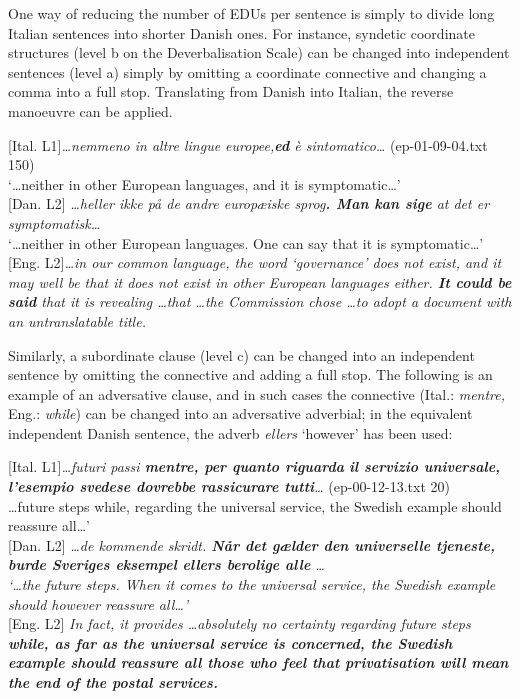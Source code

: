 \documentclass[output=paper]{LSP/langsci}
\begin{document}
One way of reducing the number of EDUs per sentence is simply to divide long Italian sentences into shorter Danish ones. For instance, syndetic coordinate structures (level b on the Deverbalisation Scale) can be changed into independent sentences (level a) simply by omitting a coordinate connective and changing a comma into a full stop. Translating from Danish into Italian, the reverse manoeuvre can be applied. 

\ea\label{ex:korzen:14}
\textup{[Ital. L1]}\textit{\ldots nemmeno in altre lingue europee\textup{,}\textbf{ed} è sintomatico\ldots } \textup{(ep-01-09-04.txt 150)}\\

  `\ldots neither in other European languages, and it is symptomatic\ldots '\\
\textup{[Dan. L2] }\textit{\ldots heller ikke på de andre europæiske sprog\textbf{. Man kan sige} at det er symptomatisk\ldots}\\ 

 `\ldots neither in other European languages. One can say that it is symptomatic\ldots '\\

\textup {[Eng. L2]}\textit{\ldots in our common language, the word  `governance' does not exist, and it may well be that it does not exist in other European languages either. \textbf{It could be said} that it is revealing \ldots  that \ldots  the Commission chose \ldots  to adopt a document with an untranslatable title.}
\z

Similarly, a subordinate clause (level c) can be changed into an independent sentence by omitting the connective and adding a full stop. The following is an example of an adversative clause, and in such cases the connective (Ital.: \textit{mentre, }Eng.: \textit{while}) can be changed into an adversative adverbial; in the equivalent independent Danish sentence, the adverb \textit{ellers }`however' has been used: 

\ea\label{ex:korzen:15}
\textup{[Ital. L1]}\textit{\ldots futuri passi \textbf{mentre, per quanto riguarda} \textbf{il servizio universale, l'esempio svedese dovrebbe rassicurare tutti}\ldots} \textup{(ep-00-12-13.txt 20)}\\
  \ldots future steps while, regarding the universal service, the Swedish example should reassure all\ldots ' \\
  \textup{[Dan. L2] }\textit{\ldots de kommende skridt. \textbf{Når det gælder den universelle tjeneste, burde Sveriges eksempel ellers berolige alle }\ldots }\\
  \textit{`\ldots the future steps. When it comes to the universal service, the Swedish example should however reassure all\ldots ' }\\
\textup{[Eng. L2]} \textit{In fact, it provides \ldots absolutely no certainty regarding future steps \textbf{while, as far as the universal service is concerned, the Swedish example should reassure all those who feel that privatisation will mean the end of the postal services.}}
\z
\end{document}
